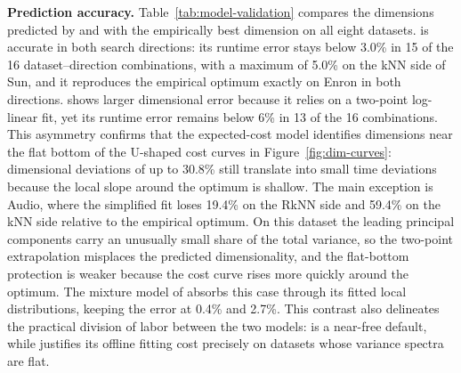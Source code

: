 \noindent\textbf{Prediction accuracy.}
Table~\ref{tab:model-validation} compares the dimensions predicted by \dualtreeopt and \dualtreefast with the empirically best dimension on all eight datasets. \dualtreeopt is accurate in both search directions: its runtime error stays below 3.0\% in 15 of the 16 dataset--direction combinations, with a maximum of 5.0\% on the kNN side of Sun, and it reproduces the empirical optimum exactly on Enron in both directions. \dualtreefast shows larger dimensional error because it relies on a two-point log-linear fit, yet its runtime error remains below 6\% in 13 of the 16 combinations. This asymmetry confirms that the expected-cost model identifies dimensions near the flat bottom of the U-shaped cost curves in Figure~\ref{fig:dim-curves}: dimensional deviations of up to 30.8\% still translate into small time deviations because the local slope around the optimum is shallow. The main exception is Audio, where the simplified fit loses 19.4\% on the RkNN side and 59.4\% on the kNN side relative to the empirical optimum. On this dataset the leading principal components carry an unusually small share of the total variance, so the two-point extrapolation misplaces the predicted dimensionality, and the flat-bottom protection is weaker because the cost curve rises more quickly around the optimum. The mixture model of \dualtreeopt absorbs this case through its fitted local distributions, keeping the error at 0.4\% and 2.7\%. This contrast also delineates the practical division of labor between the two models: \dualtreefast is a near-free default, while \dualtreeopt justifies its offline fitting cost precisely on datasets whose variance spectra are flat.

